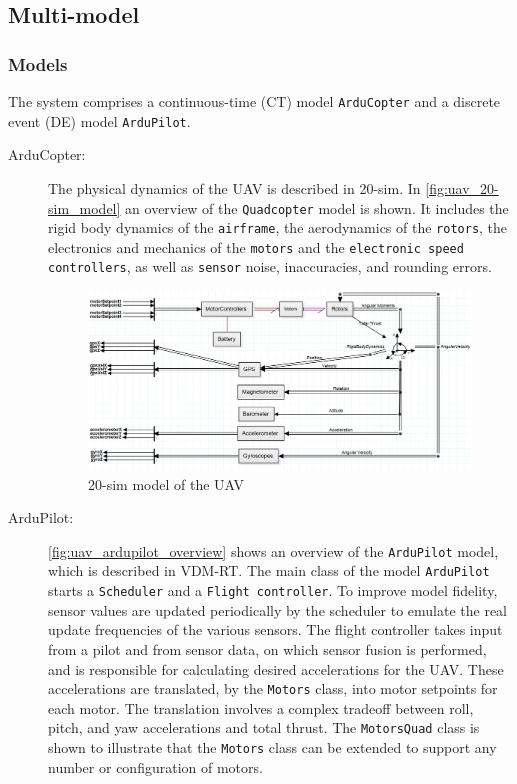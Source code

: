 	\subsection{Multi-model}
	\label{sec:uavsingle_into_mm}

	\subsubsection{Models}
		The system comprises a continuous-time (CT) model \texttt{ArduCopter} and a discrete event (DE) model \texttt{ArduPilot}.
		\begin{description}
			\item[ArduCopter:] 
				The physical dynamics of the UAV is described in 20-sim.
				In \autoref{fig:uav_20-sim_model} an overview of the \texttt{Quadcopter} model is shown.
				It includes the rigid body dynamics of the \texttt{airframe}, the aerodynamics of the \texttt{rotors}, the electronics and mechanics of the \texttt{motors} and the \texttt{electronic speed controllers}, as well as \texttt{sensor} noise, inaccuracies, and rounding errors. 
				\begin{figure}[htbp]
					\centering
					\includegraphics[width=\linewidth]{uavsingle/ct_model.png}
					\caption{20-sim model of the UAV}
					\label{fig:uav_20-sim_model}
				\end{figure}

			\item[ArduPilot:]
				\autoref{fig:uav_ardupilot_overview} shows an overview of the \texttt{ArduPilot} model, which is described in VDM-RT.
				The main class of the model \texttt{ArduPilot} starts a \texttt{Scheduler} and a \texttt{Flight controller}.
				To improve model fidelity, sensor values are updated periodically by the scheduler to emulate the real update frequencies of the various sensors.
				The flight controller takes input from a pilot and from sensor data, on which sensor fusion is performed, and is responsible for calculating desired accelerations for the UAV. 
				These accelerations are translated, by the \texttt{Motors} class, into motor setpoints for each motor.
				The translation involves a complex tradeoff between roll, pitch, and yaw accelerations and total thrust.
				The \texttt{MotorsQuad} class is shown to illustrate that the \texttt{Motors} class can be extended to support any number or configuration of motors.


\end{description}
